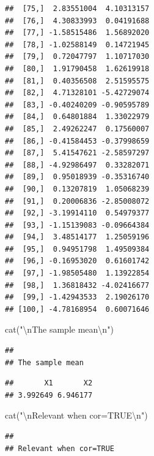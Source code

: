 \documentclass[
]{article}
\newenvironment{Shaded}{\begin{snugshade}}{\end{snugshade}}
\newcommand{\FunctionTok}[1]{\textcolor[rgb]{0.00,0.00,0.00}{#1}}
\newcommand{\NormalTok}[1]{#1}
\newcommand{\SpecialCharTok}[1]{\textcolor[rgb]{0.00,0.00,0.00}{#1}}
\newcommand{\StringTok}[1]{\textcolor[rgb]{0.31,0.60,0.02}{#1}}
\begin{document}
\begin{verbatim}
##  [75,]  2.83551004  4.10313157
##  [76,]  4.30833993  0.04191688
##  [77,] -1.58515486  1.56892020
##  [78,] -1.02588149  0.14721945
##  [79,]  0.72047797  1.10717030
##  [80,]  1.91790458  1.62619918
##  [81,]  0.40356508  2.51595575
##  [82,]  4.71328101 -5.42729074
##  [83,] -0.40240209 -0.90595789
##  [84,]  0.64801884  1.33022979
##  [85,]  2.49262247  0.17560007
##  [86,] -0.41584453 -0.37998659
##  [87,]  5.41547621 -2.58597297
##  [88,] -4.92986497  0.33282071
##  [89,]  0.95018939 -0.35316740
##  [90,]  0.13207819  1.05068239
##  [91,]  0.20006836 -2.85008072
##  [92,] -3.19914110  0.54979377
##  [93,] -1.15139083 -0.09664384
##  [94,]  3.48514177  1.25059196
##  [95,]  0.94951798  1.49509384
##  [96,] -0.16953020  0.61601742
##  [97,] -1.98505480  1.13922854
##  [98,]  1.36818432 -4.02416677
##  [99,] -1.42943533  2.19026170
## [100,] -4.78168954  0.60071646
\end{verbatim}

\begin{Shaded}
\begin{Highlighting}[]
\FunctionTok{cat}\NormalTok{(}\StringTok{"}\SpecialCharTok{\textbackslash{}n}\StringTok{The sample mean}\SpecialCharTok{\textbackslash{}n}\StringTok{"}\NormalTok{)}
\end{Highlighting}
\end{Shaded}

\begin{verbatim}
## 
## The sample mean
\end{verbatim}

\begin{Shaded}
\end{Shaded}

\begin{verbatim}
##       X1       X2 
## 3.992649 6.946177
\end{verbatim}

\begin{Shaded}
\begin{Highlighting}[]
\FunctionTok{cat}\NormalTok{(}\StringTok{"}\SpecialCharTok{\textbackslash{}n}\StringTok{Relevant when cor=TRUE}\SpecialCharTok{\textbackslash{}n}\StringTok{"}\NormalTok{)}
\end{Highlighting}
\end{Shaded}

\begin{verbatim}
## 
## Relevant when cor=TRUE
\end{verbatim}
\end{document}
